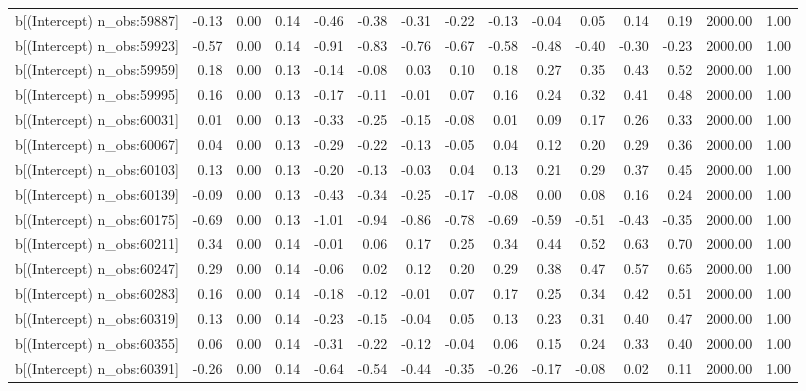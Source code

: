 \begin{table}[ht]
\begin{tabular}{rrrrrrrrrrrrrrr}
  b[(Intercept) n\_obs:59887] & -0.13 & 0.00 & 0.14 & -0.46 & -0.38 & -0.31 & -0.22 & -0.13 & -0.04 & 0.05 & 0.14 & 0.19 & 2000.00 & 1.00 \\ 
  b[(Intercept) n\_obs:59923] & -0.57 & 0.00 & 0.14 & -0.91 & -0.83 & -0.76 & -0.67 & -0.58 & -0.48 & -0.40 & -0.30 & -0.23 & 2000.00 & 1.00 \\ 
  b[(Intercept) n\_obs:59959] & 0.18 & 0.00 & 0.13 & -0.14 & -0.08 & 0.03 & 0.10 & 0.18 & 0.27 & 0.35 & 0.43 & 0.52 & 2000.00 & 1.00 \\ 
  b[(Intercept) n\_obs:59995] & 0.16 & 0.00 & 0.13 & -0.17 & -0.11 & -0.01 & 0.07 & 0.16 & 0.24 & 0.32 & 0.41 & 0.48 & 2000.00 & 1.00 \\ 
  b[(Intercept) n\_obs:60031] & 0.01 & 0.00 & 0.13 & -0.33 & -0.25 & -0.15 & -0.08 & 0.01 & 0.09 & 0.17 & 0.26 & 0.33 & 2000.00 & 1.00 \\ 
  b[(Intercept) n\_obs:60067] & 0.04 & 0.00 & 0.13 & -0.29 & -0.22 & -0.13 & -0.05 & 0.04 & 0.12 & 0.20 & 0.29 & 0.36 & 2000.00 & 1.00 \\ 
  b[(Intercept) n\_obs:60103] & 0.13 & 0.00 & 0.13 & -0.20 & -0.13 & -0.03 & 0.04 & 0.13 & 0.21 & 0.29 & 0.37 & 0.45 & 2000.00 & 1.00 \\ 
  b[(Intercept) n\_obs:60139] & -0.09 & 0.00 & 0.13 & -0.43 & -0.34 & -0.25 & -0.17 & -0.08 & 0.00 & 0.08 & 0.16 & 0.24 & 2000.00 & 1.00 \\ 
  b[(Intercept) n\_obs:60175] & -0.69 & 0.00 & 0.13 & -1.01 & -0.94 & -0.86 & -0.78 & -0.69 & -0.59 & -0.51 & -0.43 & -0.35 & 2000.00 & 1.00 \\ 
  b[(Intercept) n\_obs:60211] & 0.34 & 0.00 & 0.14 & -0.01 & 0.06 & 0.17 & 0.25 & 0.34 & 0.44 & 0.52 & 0.63 & 0.70 & 2000.00 & 1.00 \\ 
  b[(Intercept) n\_obs:60247] & 0.29 & 0.00 & 0.14 & -0.06 & 0.02 & 0.12 & 0.20 & 0.29 & 0.38 & 0.47 & 0.57 & 0.65 & 2000.00 & 1.00 \\ 
  b[(Intercept) n\_obs:60283] & 0.16 & 0.00 & 0.14 & -0.18 & -0.12 & -0.01 & 0.07 & 0.17 & 0.25 & 0.34 & 0.42 & 0.51 & 2000.00 & 1.00 \\ 
  b[(Intercept) n\_obs:60319] & 0.13 & 0.00 & 0.14 & -0.23 & -0.15 & -0.04 & 0.05 & 0.13 & 0.23 & 0.31 & 0.40 & 0.47 & 2000.00 & 1.00 \\ 
  b[(Intercept) n\_obs:60355] & 0.06 & 0.00 & 0.14 & -0.31 & -0.22 & -0.12 & -0.04 & 0.06 & 0.15 & 0.24 & 0.33 & 0.40 & 2000.00 & 1.00 \\ 
  b[(Intercept) n\_obs:60391] & -0.26 & 0.00 & 0.14 & -0.64 & -0.54 & -0.44 & -0.35 & -0.26 & -0.17 & -0.08 & 0.02 & 0.11 & 2000.00 & 1.00 \\ 

\end{tabular}
\end{table}
